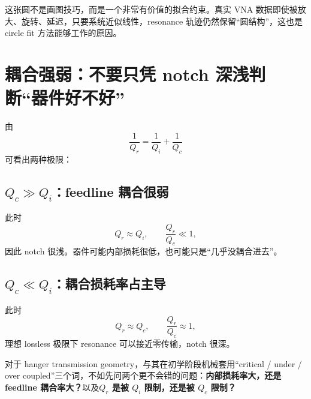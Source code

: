 \documentclass[11pt,a4paper,openany]{ctexrep}
\begin{document}
\begin{center}
\end{center}

这张圆不是画图技巧，而是一个非常有价值的拟合约束。真实 VNA 数据即使被放大、旋转、延迟，只要系统近似线性，resonance 轨迹仍然保留“圆结构”，这也是 circle fit 方法能够工作的原因。

\section{耦合强弱：不要只凭 notch 深浅判断“器件好不好”}

由
\[
\frac1{Q_r}=\frac1{Q_i}+\frac1{Q_c}
\]
可看出两种极限：

\subsection{$Q_c\gg Q_i$：feedline 耦合很弱}
此时
\[
Q_r\approx Q_i,
\qquad
\frac{Q_r}{Q_c}\ll1,
\]
因此 notch 很浅。器件可能内部损耗很低，也可能只是“几乎没耦合进去”。

\subsection{$Q_c\ll Q_i$：耦合损耗率占主导}
此时
\[
Q_r\approx Q_c,
\qquad
\frac{Q_r}{Q_c}\approx1,
\]
理想 lossless 极限下 resonance 可以接近零传输，notch 很深。

\begin{intuitionbox}
对于 hanger transmission geometry，与其在初学阶段机械套用“critical / under / over coupled”三个词，不如先问两个更不会错的问题：\textbf{内部损耗率大，还是 feedline 耦合率大？}以及\textbf{$Q_r$ 是被 $Q_i$ 限制，还是被 $Q_c$ 限制？}
\end{intuitionbox}
\end{document}
